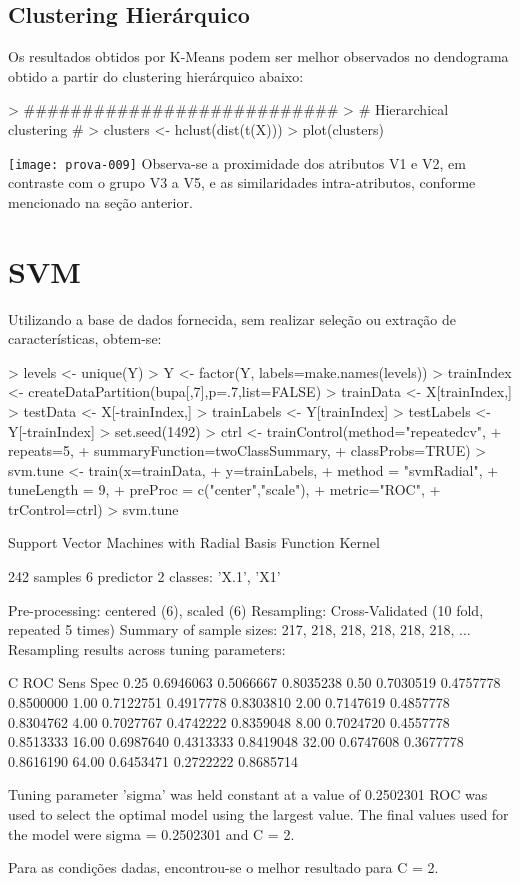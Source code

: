 \documentclass{article}
\begin{document}
\subsection{Clustering Hierárquico}
Os resultados obtidos por K-Means podem ser melhor observados no dendograma obtido a partir do clustering hierárquico abaixo:
\begin{Schunk}
\begin{Sinput}
> ###########################
> # Hierarchical clustering #
> clusters <- hclust(dist(t(X)))
> plot(clusters)
\end{Sinput}
\end{Schunk}
\texttt{[image: prova-009]}
Observa-se a proximidade dos atributos V1 e V2, em contraste com o grupo V3 a V5, e as similaridades intra-atributos, conforme mencionado na seção anterior.

\section{SVM}
Utilizando a base de dados fornecida, sem realizar seleção ou extração de características, obtem-se:
\begin{Schunk}
\begin{Sinput}
> levels <- unique(Y) 
> Y <- factor(Y, labels=make.names(levels))
> trainIndex <- createDataPartition(bupa[,7],p=.7,list=FALSE)
> trainData <- X[trainIndex,]
> testData  <- X[-trainIndex,]
> trainLabels <- Y[trainIndex]
> testLabels <- Y[-trainIndex]
> set.seed(1492)
> ctrl <- trainControl(method="repeatedcv",
+                      repeats=5,
+                      summaryFunction=twoClassSummary,
+                      classProbs=TRUE)
> svm.tune <- train(x=trainData,
+                   y=trainLabels,
+                   method = "svmRadial",
+                   tuneLength = 9,
+                   preProc = c("center","scale"),
+                   metric="ROC",
+                   trControl=ctrl)
> svm.tune
\end{Sinput}
\begin{Soutput}
Support Vector Machines with Radial Basis Function Kernel 

242 samples
  6 predictor
  2 classes: 'X.1', 'X1' 

Pre-processing: centered (6), scaled (6) 
Resampling: Cross-Validated (10 fold, repeated 5 times) 
Summary of sample sizes: 217, 218, 218, 218, 218, 218, ... 
Resampling results across tuning parameters:

  C      ROC        Sens       Spec     
   0.25  0.6946063  0.5066667  0.8035238
   0.50  0.7030519  0.4757778  0.8500000
   1.00  0.7122751  0.4917778  0.8303810
   2.00  0.7147619  0.4857778  0.8304762
   4.00  0.7027767  0.4742222  0.8359048
   8.00  0.7024720  0.4557778  0.8513333
  16.00  0.6987640  0.4313333  0.8419048
  32.00  0.6747608  0.3677778  0.8616190
  64.00  0.6453471  0.2722222  0.8685714

Tuning parameter 'sigma' was held constant at a value of 0.2502301
ROC was used to select the optimal model using  the largest value.
The final values used for the model were sigma = 0.2502301 and C = 2.
\end{Soutput}
\end{Schunk}
Para as condições dadas, encontrou-se o melhor resultado para C = 2.
\end{document}
